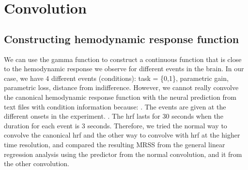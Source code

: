 \section {Convolution}

\subsection{Constructing hemodynamic response function}
We can use the gamma function to construct a continuous function that is close to 
the hemodynamic response we observe for different events in the brain. In our case,
we have 4 different events (conditions): task = \{0,1\}, parametric gain, parametric loss, distance 
from indifference. However, we cannot really convolve the canonical hemodynamic response function with the neural prediction from text files with condition information because:\newline
\newline
{}. The events are given at the different onsets in the experiment.\newline
{}. The hrf lasts for 30 seconds when the duration for each event is 3 seconds.\newline
\newline
Therefore, we tried the normal way to convolve the canonical hrf and the other way to convolve with hrf at the higher time resolution, and compared the resulting MRSS from the general linear regression analysis using the predictor from the normal convolution, and it from the other convolution.\newline


